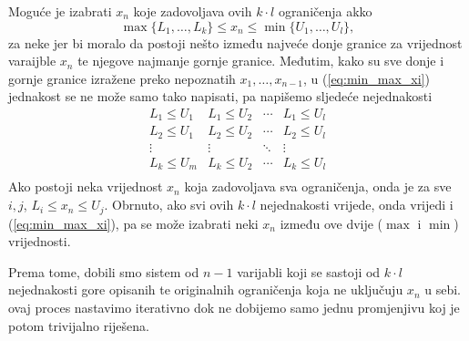\documentclass[a4paper, utf8, 11pt, colorlinks]{book}
\begin{document}
 Moguće je izabrati $x_n$ koje zadovoljava ovih $k \cdot l$ ograničenja akko 
 \begin{equation}\label{eq:min_max_xi}
     \max\{L_1,\ldots, L_k \} \leq x_n \leq \min \{ U_1, \ldots, U_l \},
   \end{equation}
za neke 
 jer bi moralo da postoji nešto između najveće donje granice za vrijednost varaijble $x_n$ te njegove najmanje gornje granice. Međutim, kako su sve donje i gornje granice izražene preko nepoznatih $x_1, \ldots, x_{n-1}$,  u (\ref{eq:min_max_xi}) jednakost se ne može samo tako napisati, pa napišemo sljedeće nejednakosti 
 $$\begin{array}{cccc}
       L_1 \leq U_1 & L_1 \leq U_2   &  \cdots   & L_1 \leq U_l \\
       L_2 \leq U_1 & L_2  \leq U_2  &  \cdots   & L_2 \leq U_l \\
       \vdots       &     \vdots     &   \ddots  & \vdots       \\
       L_k \leq U_m &  L_k \leq U_2  &   \cdots  & L_k \leq U_l \\
 \end{array}$$ 
Ako postoji neka vrijednost  $x_n$ koja zadovoljava sva ograničenja, onda je za sve $i,j$, 
$L_i \leq x_n \leq U_j$. Obrnuto, ako svi ovih $k \cdot l$ nejednakosti vrijede, onda vrijedi i (\ref{eq:min_max_xi}), pa se može izabrati neki $x_n$ između ove dvije ($\max$ i $\min$) vrijednosti. 

Prema tome, dobili smo sistem od $n-1$ varijabli koji se sastoji od  $k \cdot l$ nejednakosti gore opisanih te originalnih ograničenja koja ne uključuju $x_n$ u sebi. ovaj proces nastavimo iterativno dok ne dobijemo samo jednu promjenjivu koj je potom trivijalno riješena. 
\end{document}
